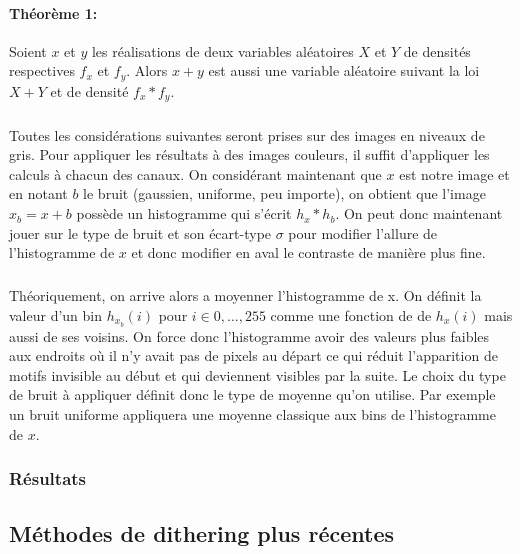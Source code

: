 \documentclass{article}
\begin{document}
\paragraph*{Théorème 1:} Soient $x$ et $y$ les réalisations de deux variables aléatoires $X$ et $Y$ de densités respectives $f_x$ et $f_y$. Alors $x+y$ est aussi une variable aléatoire suivant la loi $X+Y$ et de densité $f_x * f_y$.
\subparagraph{} Toutes les considérations suivantes seront prises sur des images en niveaux de gris. Pour appliquer les résultats à des images couleurs, il suffit d'appliquer les calculs à chacun des canaux. On considérant maintenant que $x$ est notre image et en notant $b$ le bruit (gaussien, uniforme, peu importe), on obtient que l'image $x_b = x+b$ possède un histogramme qui s'écrit $h_x * h_b$. On peut donc maintenant jouer sur le type de bruit et son écart-type $\sigma$ pour modifier l'allure de l'histogramme  de $x$ et donc modifier en aval le contraste de manière plus fine.
\subparagraph*{} Théoriquement, on arrive alors a moyenner l'histogramme de x. On définit la valeur d'un bin $h_{x_b}(i)$ pour $i \in {0,...,255}$ comme une fonction de de $h_x(i)$ mais aussi de ses voisins. On force donc l'histogramme avoir des valeurs plus faibles aux endroits où il n'y avait pas de pixels au départ ce qui réduit l'apparition de motifs invisible au début et qui deviennent visibles par la suite. Le choix du type de bruit à appliquer définit donc le type de moyenne qu'on utilise. Par exemple un bruit uniforme appliquera une moyenne classique aux bins de l'histogramme de $x$.

\subsubsection*{Résultats}

\subsection*{Méthodes de dithering plus récentes}
\end{document}
